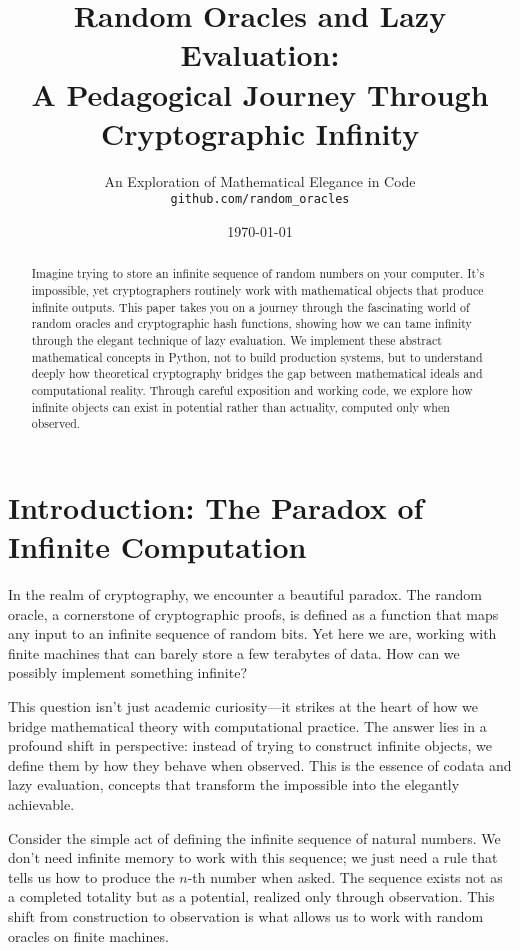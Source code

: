 \documentclass[11pt]{article}
\title{Random Oracles and Lazy Evaluation:\\
A Pedagogical Journey Through Cryptographic Infinity}
\author{
    An Exploration of Mathematical Elegance in Code\\
    \texttt{github.com/random\_oracles}
}
\date{\today}
\begin{document}
\maketitle

\begin{abstract}
Imagine trying to store an infinite sequence of random numbers on your computer. It's impossible, yet cryptographers routinely work with mathematical objects that produce infinite outputs. This paper takes you on a journey through the fascinating world of random oracles and cryptographic hash functions, showing how we can tame infinity through the elegant technique of lazy evaluation. We implement these abstract mathematical concepts in Python, not to build production systems, but to understand deeply how theoretical cryptography bridges the gap between mathematical ideals and computational reality. Through careful exposition and working code, we explore how infinite objects can exist in potential rather than actuality, computed only when observed.
\end{abstract}

\section{Introduction: The Paradox of Infinite Computation}

In the realm of cryptography, we encounter a beautiful paradox. The random oracle, a cornerstone of cryptographic proofs, is defined as a function that maps any input to an infinite sequence of random bits. Yet here we are, working with finite machines that can barely store a few terabytes of data. How can we possibly implement something infinite?

This question isn't just academic curiosity---it strikes at the heart of how we bridge mathematical theory with computational practice. The answer lies in a profound shift in perspective: instead of trying to construct infinite objects, we define them by how they behave when observed. This is the essence of codata and lazy evaluation, concepts that transform the impossible into the elegantly achievable.

Consider the simple act of defining the infinite sequence of natural numbers. We don't need infinite memory to work with this sequence; we just need a rule that tells us how to produce the $n$-th number when asked. The sequence exists not as a completed totality but as a potential, realized only through observation. This shift from construction to observation is what allows us to work with random oracles on finite machines.
\end{document}
